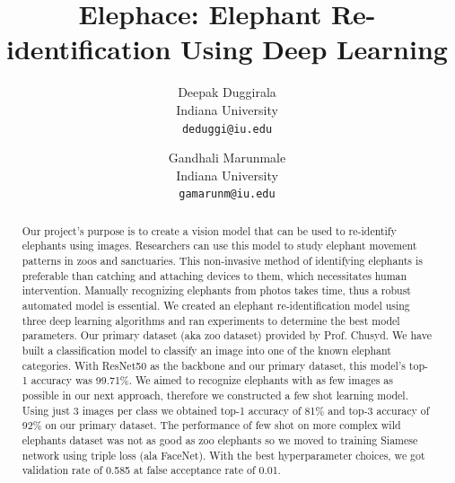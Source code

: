 \documentclass[10pt,twocolumn,letterpaper]{article}
\begin{document}
\title{Elephace: Elephant Re-identification Using Deep Learning}

\author{Deepak Duggirala\\
Indiana University\\
{\tt\small deduggi@iu.edu}
\and
Gandhali Marunmale\\
Indiana University\\
{\tt\small gamarunm@iu.edu}
}
\maketitle

\begin{abstract}

Our project's purpose is to create a vision model that can be used to re-identify elephants using images. Researchers can use this model to study elephant movement patterns in zoos and sanctuaries. This non-invasive method of identifying elephants is preferable than catching and attaching devices to them, which necessitates human intervention. Manually recognizing elephants from photos takes time, thus a robust automated model is essential. We created an elephant re-identification model using three deep learning algorithms and ran experiments to determine the best model parameters. Our primary dataset (aka zoo dataset) provided by Prof. Chusyd. We have built a classification model to classify an image into one of the known elephant categories. With ResNet50 as the backbone and our primary dataset, this model's top-1 accuracy was 99.71\%. We aimed to recognize elephants with as few images as possible in our next approach, therefore we constructed a few shot learning model. Using just 3 images per class we obtained top-1 accuracy of 81\% and top-3 accuracy of 92\% on our primary dataset. The performance of few shot on more complex wild elephants dataset was not as good as zoo elephants so we moved to training Siamese network using triple loss (ala FaceNet). With the best hyperparameter choices, we got validation rate of 0.585 at false acceptance rate of 0.01.



\end{abstract}
\end{document}
